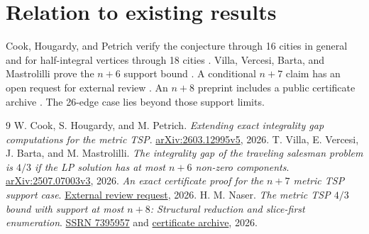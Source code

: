 \documentclass[11pt]{article}
\begin{document}
\section{Relation to existing results}
Cook, Hougardy, and Petrich verify the conjecture through 16 cities
in general and for half-integral vertices through 18 cities \cite{chp}.
Villa, Vercesi, Barta, and Mastrolilli prove the \(n+6\) support bound
\cite{vvbm}. A conditional \(n+7\) claim has an open request for external
review \cite{regev}. An \(n+8\) preprint includes a public certificate
archive \cite{naser}. The 26-edge case lies beyond those support limits.

\begin{thebibliography}{9}
 W. Cook, S. Hougardy, and M. Petrich.
\emph{Extending exact integrality gap computations for the metric TSP}.
\href{https://arxiv.org/html/2603.12995v5}{arXiv:2603.12995v5}, 2026.
 T. Villa, E. Vercesi, J. Barta, and M. Mastrolilli.
\emph{The integrality gap of the traveling salesman problem is \(4/3\)
if the LP solution has at most \(n+6\) non-zero components}.
\href{https://arxiv.org/abs/2507.07003v3}{arXiv:2507.07003v3}, 2026.
\emph{An exact certificate proof for the \(n+7\) metric TSP support case}.
\href{https://github.com/GiladR1979/metric-tsp-nplus7-certificates/issues/1}{External review request}, 2026.
 H. M. Naser.
\emph{The metric TSP \(4/3\) bound with support at most \(n+8\):
Structural reduction and slice-first enumeration}.
\href{https://papers.ssrn.com/sol3/papers.cfm?abstract_id=7395957}{SSRN 7395957}
and \href{https://zenodo.org/records/21870868}{certificate archive}, 2026.
\end{thebibliography}
\end{document}
